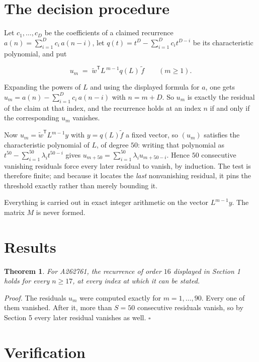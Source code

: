 \documentclass[11pt]{article}
\newtheorem{theorem}{Theorem}
\theoremstyle{definition}
\begin{document}
\section{The decision procedure}

Let $c_1,\dots,c_D$ be the coefficients of a claimed recurrence $a(n) = \sum_{i=1}^{D} c_i\,a(n-i)$, let $q(t) = t^{D} - \sum_{i=1}^{D} c_i t^{D-i}$ be its characteristic polynomial, and put

\[u_m \;=\; \tilde w^{\mathsf T} L^{\,m-1} q(L)\,\tilde f \qquad (m \ge 1).\]

Expanding the powers of $L$ and using the displayed formula for $a$, one gets $u_m = a(n) - \sum_{i=1}^{D} c_i\,a(n-i)$ with $n = m + D$. So $u_m$ is exactly the residual of the claim at that index, and the recurrence holds at an index $n$ if and only if the corresponding $u_m$ vanishes.

Now $u_m = \tilde w^{\mathsf T} L^{m-1} y$ with $y = q(L)\tilde f$ a fixed vector, so $(u_m)$ satisfies the characteristic polynomial of $L$, of degree $50$: writing that polynomial as $t^{50} - \sum_{i=1}^{50} \lambda_i t^{50-i}$ gives $u_{m+50} = \sum_{i=1}^{50} \lambda_i u_{m+50-i}$. Hence $50$ consecutive vanishing residuals force every later residual to vanish, by induction. The test is therefore finite; and because it locates the {\itshape last} nonvanishing residual, it pins the threshold exactly rather than merely bounding it.

Everything is carried out in exact integer arithmetic on the vector $L^{m-1}y$. The matrix $M$ is never formed.

\section{Results}

\begin{theorem} For A262761, the recurrence of order $16$ displayed in Section 1 holds for every $n \ge 17$, at every index at which it can be stated.\end{theorem}

{\itshape Proof.} The residuals $u_m$ were computed exactly for $m = 1,\dots,90$. Every one of them vanished. After it, more than $S = 50$ consecutive residuals vanish, so by Section 5 every later residual vanishes as well. $\square$

\section{Verification}
\end{document}
